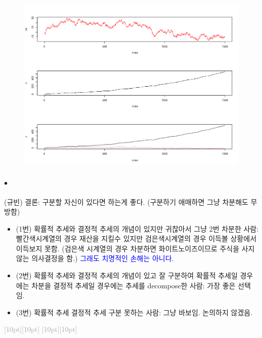 \documentclass[12pt,oneside,english]{book}
\newcommand{\rdash}{\noindent \textcolor{darkgray}{ \raisebox{-1.9pt}[10pt][10pt]{\leafright} \hrulefill \raisebox{-1.9pt}[10pt][10pt]{\leafright \decofourleft \decothreeleft  \aldineright \decotwo \floweroneleft \decoone}}}
\def\ck{\paragraph{\Large$\bullet$}\Large}
\begin{document}
\begin{figure}[h]
\includegraphics[width=1\textwidth]{fig2.png}
\end{figure}


\ck (규빈) 결론: 구분할 자신이 있다면 하는게 좋다. (구분하기 애매하면 그냥 차분해도 무방함)
\begin{itemize}
	\item (1번) 확률적 추세와 결정적 추세의 개념이 있지만 귀찮아서 그냥 2번 차분한 사람: 빨간색시계열의 경우 재산을 지킬수 있지만 검은색시계열의 경우 이득볼 상황에서 이득보지 못함. (검은색 시계열의 경우 차분하면 화이트노이즈이므로 주식을 사지 않는 의사결정을 함.) \textcolor{blue}{그래도 치명적인 손해는 아니다.}
	\item (2번) 확률적 추세와 결정적 추세의 개념이 있고 잘 구분하여 확률적 추세일 경우에는 차분을 결정적 추세일 경우에는 추세를 decompose한 사람: 가장 좋은 선택임.  
	\item (3번) 확률적 추세 결정적 추세 구분 못하는 사람: 그냥 바보임. 논의하지 않겠음. 
\end{itemize}

\rdash 
\end{document}
